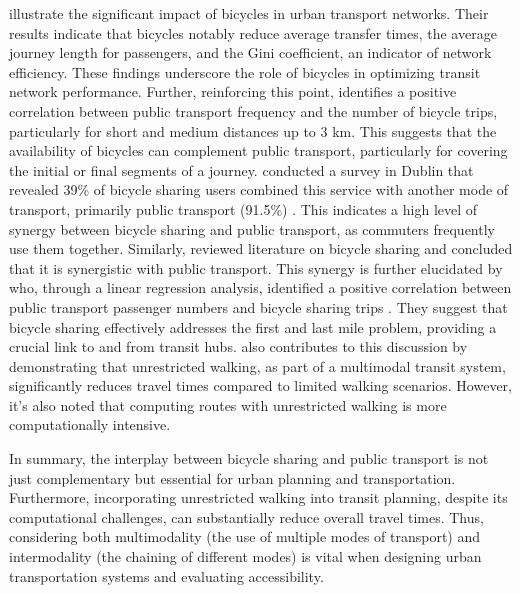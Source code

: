  illustrate the significant impact of bicycles in urban transport networks. 
Their results indicate that bicycles notably reduce average transfer times, the average journey length for passengers, and the Gini coefficient, an indicator of network efficiency. 
These findings underscore the role of bicycles in optimizing transit network performance.
Further, reinforcing this point,  identifies a positive correlation between public transport frequency and the number of bicycle trips, particularly for short and medium distances up to 3 km. 
This suggests that the availability of bicycles can complement public transport, particularly for covering the initial or final segments of a journey.
 conducted a survey in Dublin that revealed 39\% of bicycle sharing users combined this service with another mode of transport, primarily public transport (91.5\%) . 
This indicates a high level of synergy between bicycle sharing and public transport, as commuters frequently use them together.
Similarly,  reviewed literature on bicycle sharing and concluded that it is synergistic with public transport.
This synergy is further elucidated by  who, through a linear regression analysis, identified a positive correlation between public transport passenger numbers and bicycle sharing trips . 
They suggest that bicycle sharing effectively addresses the first and last mile problem, providing a crucial link to and from transit hubs.
 also contributes to this discussion by demonstrating that unrestricted walking, as part of a multimodal transit system, significantly reduces travel times compared to limited walking scenarios.
However, it's also noted that computing routes with unrestricted walking is more computationally intensive.

In summary, the interplay between bicycle sharing and public transport is not just complementary but essential for urban planning and transportation.
Furthermore, incorporating unrestricted walking into transit planning, despite its computational challenges, can substantially reduce overall travel times.
Thus, considering both multimodality (the use of multiple modes of transport) and intermodality (the chaining of different modes) is vital when designing urban transportation systems and evaluating accessibility.
